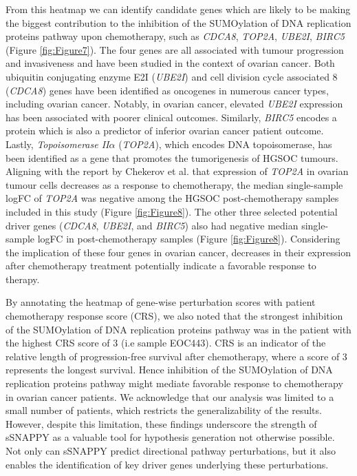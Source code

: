 \documentclass[9pt,a4paper,]{extarticle}
\begin{document}
From this heatmap we can identify candidate genes which are likely to be making the biggest contribution to the inhibition of the SUMOylation of DNA replication proteins pathway upon chemotherapy,
such as \emph{CDCA8}, \emph{TOP2A}, \emph{UBE2I}, \emph{BIRC5} (Figure \ref{fig:Figure7}).
The four genes are all associated with tumour progression and invasiveness and have been studied in the context of ovarian cancer.
Both ubiquitin conjugating enzyme E2I (\emph{UBE2I}) and cell division cycle associated 8 (\emph{CDCA8}) genes have been identified as oncogenes in numerous cancer types, including ovarian cancer\citep{Dong2013, qi2021}.
Notably, in ovarian cancer, elevated \emph{UBE2I} expression has been associated with poorer clinical outcomes\citep{Zou2020}.
Similarly, \emph{BIRC5} encodes a protein which is also a predictor of inferior ovarian cancer patient outcome\citep{Gasowska-Bajger2021}.
Lastly, \emph{Topoisomerase II}\(\alpha\) (\emph{TOP2A}), which encodes DNA topoisomerase, has been identified as a gene that promotes the tumorigenesis of HGSOC tumours\citep{Gao2020}.
Aligning with the report by Chekerov et al.\citep{Chekerov2006} that expression of \emph{TOP2A} in ovarian tumour cells decreases as a response to chemotherapy\citep{Chekerov2006}, the median single-sample logFC of \emph{TOP2A} was negative among the HGSOC post-chemotherapy samples included in this study (Figure \ref{fig:Figure8}).
The other three selected potential driver genes (\emph{CDCA8}, \emph{UBE2I}, and \emph{BIRC5}) also had negative median single-sample logFC in post-chemotherapy samples (Figure \ref{fig:Figure8}).
Considering the implication of these four genes in ovarian cancer, decreases in their expression after chemotherapy treatment potentially indicate a favorable response to therapy.

By annotating the heatmap of gene-wise perturbation scores with patient chemotherapy response score (CRS), we also noted that the strongest inhibition of the SUMOylation of DNA replication proteins pathway was in the patient with the highest CRS score of 3 (i.e sample EOC443).
CRS is an indicator of the relative length of progression-free survival after chemotherapy, where a score of 3 represents the longest survival.
Hence inhibition of the SUMOylation of DNA replication proteins pathway might mediate favorable response to chemotherapy in ovarian cancer patients.
We acknowledge that our analysis was limited to a small number of patients, which restricts the generalizability of the results.
However, despite this limitation, these findings underscore the strength of sSNAPPY as a valuable tool for hypothesis generation not otherwise possible.
Not only can sSNAPPY predict directional pathway perturbations, but it also enables the identification of key driver genes underlying these perturbations.
\end{document}
